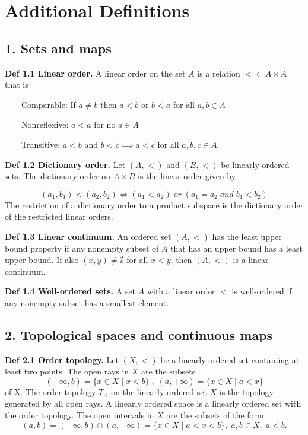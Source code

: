 \documentclass[11pt]{diazessay} %
\begin{document}
\newpage

\section*{Additional Definitions}

\subsection*{1. Sets and maps}

\vskip 3pt
\textbf{Def 1.1 Linear order.} A linear order on the set $A$ is a relation $<\subset A \times A$ that is

\vskip 3pt
$\qquad$Comparable: If $a \not= b $ then $a < b$ or $b < a$ for all $a, b \in A$

\vskip 3pt
$\qquad$Nonreflexive: $a < a$ for no $a \in A$

\vskip 3pt
$\qquad$Transitive: $a < b$ and $b < c \implies a < c$ for all $a, b, c \in A$

\vskip 12pt
\textbf{Def 1.2 Dictionary order.} Let $(A, <)$ and $(B, <)$ be linearly ordered sets. 
The dictionary order on $A \times B$ is the linear order given by

\vskip -6pt
\begin{equation*}
	(a_1, b_1) < (a_2, b_2)  \Longleftrightarrow  (a_1 < a_2) \;or\; (a_1 = a_2 \;and\; b_1 < b_2)
\end{equation*}
\noindent
The restriction of a dictionary order to a product subspace is the dictionary order of the restricted
linear orders.

\vskip 12pt
\textbf{Def 1.3 Linear continuum.} An ordered set $(A, <)$ has the least upper bound property if any nonempty subset
of $A$ that has an upper bound has a least upper bound. 
If also $(x, y) \not= \emptyset$ for all $x < y$, then $(A, <)$ is a
linear continuum.

\vskip 12pt
\textbf{Def 1.4 Well-ordered sets.} A set $A$ with a linear order $<$ is well-ordered if any nonempty subset has a smallest
element.
\subsection*{2. Topological spaces and continuous maps}

\vskip 3pt
\textbf{Def 2.1 Order topology.} Let $(X, <)$ be a linearly ordered set containing at least two points.
The open rays in $X$ are the subsets
\begin{equation*}
	(-\infty, b) = \{x \in X \; | \; x < b\}\;,\; (a, +\infty) = \{x \in X \; | \; a < x\}
\end{equation*}
\noindent
of X. The order topology $T_<$ on the linearly ordered set $X$ is the topology generated by
all open rays. 
A linearly ordered space is a linearly ordered set with the order topology.
The open intervals in $X$ are the subsets of the form
\begin{equation*}
	(a, b) = (-\infty, b) \cap (a, +\infty) = \{x \in X \; | \; a < x < b\},\; a, b \in X, \;a < b.
\end{equation*}
\end{document}
